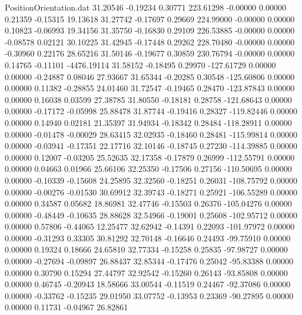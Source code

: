 \begin{filecontents}{PositionOrientation.dat}
  31.20546   -0.19234    0.30771   223.61298   -0.00000    0.00000    0.21359   -0.15315   19.13618
  31.27742   -0.17697    0.29669   224.99000   -0.00000    0.00000    0.10823   -0.06993   19.34156
  31.35750   -0.16830    0.29109   226.53885   -0.00000    0.00000   -0.08578    0.02121   30.10225
  31.42945   -0.17448    0.29262   228.70480   -0.00000    0.00000   -0.30960    0.22176   28.65216
  31.50146   -0.19677    0.30859   230.76794   -0.00000    0.00000    0.14765   -0.11101 -4476.19114
  31.58152   -0.18495    0.29970  -127.61729    0.00000    0.00000   -0.24887    0.08046   27.93667
  31.65344   -0.20285    0.30548  -125.60806    0.00000    0.00000    0.11382   -0.28855   24.01460
  31.72547   -0.19465    0.28470  -123.87843    0.00000    0.00000    0.16038    0.03599   27.38785
  31.80550   -0.18181    0.28758  -121.68643    0.00000    0.00000   -0.17172   -0.05998   25.88478
  31.87744   -0.19416    0.28327  -119.82446    0.00000    0.00000    0.14940    0.02181   21.35397
  31.94934   -0.18342    0.28484  -118.28911    0.00000    0.00000   -0.01478   -0.00029   28.63415
  32.02935   -0.18460    0.28481  -115.99814    0.00000    0.00000   -0.03941   -0.17351   22.17716
  32.10146   -0.18745    0.27230  -114.39885    0.00000    0.00000    0.12007   -0.03205   25.52635
  32.17358   -0.17879    0.26999  -112.55791    0.00000    0.00000    0.04663    0.01966   25.66106
  32.25350   -0.17506    0.27156  -110.50695    0.00000    0.00000   -0.10339   -0.15608   24.25895
  32.32560   -0.18251    0.26031  -108.75792    0.00000    0.00000   -0.00276   -0.01530   30.69912
  32.39743   -0.18271    0.25921  -106.55289    0.00000    0.00000    0.34587    0.05682   18.86981
  32.47746   -0.15503    0.26376  -105.04276    0.00000    0.00000   -0.48449   -0.10635   28.88628
  32.54966   -0.19001    0.25608  -102.95712    0.00000    0.00000    0.57806   -0.44065   12.25477
  32.62942   -0.14391    0.22093  -101.97972    0.00000    0.00000   -0.31293    0.33305   30.81292
  32.70148   -0.16646    0.24493   -99.75910    0.00000    0.00000    0.19324    0.18666   24.65810
  32.77334   -0.15258    0.25835   -97.98727    0.00000    0.00000   -0.27694   -0.09897   26.88437
  32.85344   -0.17476    0.25042   -95.83388    0.00000    0.00000    0.30790    0.15294   27.44797
  32.92542   -0.15260    0.26143   -93.85808    0.00000    0.00000    0.46745   -0.20943   18.58666
  33.00544   -0.11519    0.24467   -92.37086    0.00000    0.00000   -0.33762   -0.15235   29.01950
  33.07752   -0.13953    0.23369   -90.27895    0.00000    0.00000    0.11731   -0.04967   26.82861

\end{filecontents}
